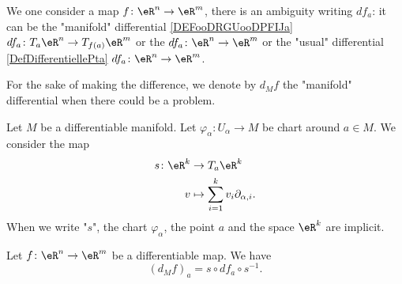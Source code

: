 \begin{normaltext}		\label{NORMooGEFJooALLfTa}
	We one consider a map \(f \colon \eR^n\to \eR^m  \), there is an ambiguity writing \( df_a\): it can be the "manifold" differential \ref{DEFooDRGUooDPFIJa}  \(df_a \colon T_{a}\eR^n\to T_{f(a)}\eR^m  \) or the \(df_a \colon \eR^n\to \eR^m  \) or the
	"usual" differential \ref{DefDifferentiellePta} \(df_a \colon \eR^n\to \eR^m  \).

	For the sake of making the difference, we denote by \( d_Mf\) the "manifold" differential when there could be a problem.


	Let \( M\) be a differentiable manifold. Let \(\varphi_{\alpha} \colon U_{\alpha}\to M  \) be chart around \( a\in M\). We consider the map
	\begin{equation}
		\begin{aligned}
			s\colon \eR^k & \to T_a\eR^k                                \\
			v             & \mapsto \sum_{i=1}^kv_i\partial_{\alpha,i}.
		\end{aligned}
	\end{equation}
	When we write "\( s\)", the chart \( \varphi_{\alpha}\), the point \( a\) and the space \( \eR^k\) are implicit.
\end{normaltext}

\begin{proposition}	\label{PROPooORWSooAZsGzz}
	Let \(f \colon \eR^n\to \eR^m  \) be a differentiable map. We have
	\begin{equation}		\label{EQooFIUPooHswOVm}
		(d_Mf)_a=s\circ df_a\circ s^{-1}.
	\end{equation}
\end{proposition}

